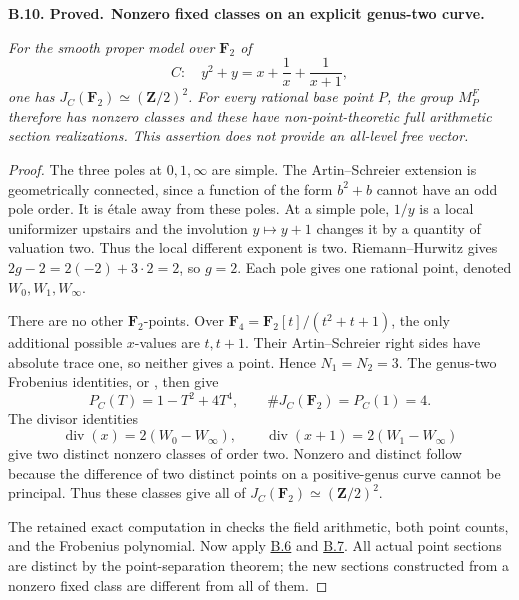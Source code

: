 \documentclass[11pt,a4paper]{article}
\newcommand{\Z}{\mathbf Z}
\newcommand{\F}{\mathbf F}
\newenvironment{claim}[3]{\par\medskip\noindent\hypertarget{#1}{\textbf{#1. #2.}}\ \textbf{#3.}\par\nopagebreak\smallskip\begingroup\itshape}{\endgroup\par\smallskip}
\newcommand{\statementref}[1]{\hyperlink{#1}{#1}}
\begin{document}
\begin{claim}{B.10}{Proved}{Nonzero fixed classes on an explicit genus-two curve}
For the smooth proper model over $\F_2$ of
\[
                     C:\quad y^2+y=x+\frac1x+\frac1{x+1},
\]
one has $J_C(\F_2)\simeq(\Z/2)^2$. For every rational base point
$P$, the group $M_P^F$ therefore has nonzero classes and these
have non-point-theoretic full arithmetic section realizations.
This assertion does not provide an all-level free vector.
\end{claim}
\begin{proof}
The three poles at $0,1,\infty$ are simple. The Artin--Schreier
extension is geometrically connected, since a function of the form
$b^2+b$ cannot have an odd pole order. It is étale away from these
poles. At a simple pole, $1/y$ is a local uniformizer upstairs and
the involution $y\mapsto y+1$ changes it by a quantity of valuation
two. Thus the local different exponent is two. Riemann--Hurwitz
gives $2g-2=2(-2)+3\cdot2=2$, so $g=2$. Each pole gives one
rational point, denoted $W_0,W_1,W_\infty$.

There are no other $\F_2$-points. Over
$\F_4=\F_2[t]/(t^2+t+1)$, the only additional possible
$x$-values are $t,t+1$. Their Artin--Schreier right sides have
absolute trace one, so neither gives a point. Hence $N_1=N_2=3$.
The genus-two Frobenius identities, or
\cite[Theorem 11.1 and Corollary 11.4]{MilneJac}, then give
\[
              P_C(T)=1-T^2+4T^4,\qquad \#J_C(\F_2)=P_C(1)=4.
\]
The divisor identities
\[
 \operatorname{div}(x)=2(W_0-W_\infty),\qquad
 \operatorname{div}(x+1)=2(W_1-W_\infty)
\]
give two distinct nonzero classes of order two. Nonzero and
distinct follow because the difference of two distinct points on
a positive-genus curve cannot be principal. Thus these classes
give all of $J_C(\F_2)\simeq(\Z/2)^2$.

The retained exact computation in
 checks the field arithmetic,
both point counts, and the Frobenius polynomial. Now apply
\statementref{B.6} and \statementref{B.7}. All actual point
sections are distinct by the point-separation theorem; the new
sections constructed from a nonzero fixed class are different
from all of them.
\end{proof}
\end{document}
